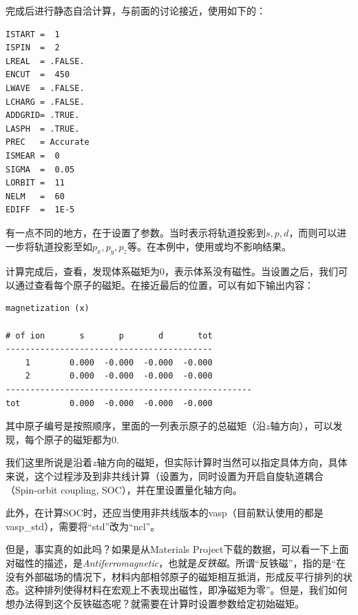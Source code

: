 完成后进行静态自洽计算，与前面的讨论接近，使用如下的：

\begin{lstlisting}[caption=INCAR]
ISTART =  1
ISPIN  =  2
LREAL  = .FALSE.
ENCUT  =  450
LWAVE  = .FALSE.
LCHARG = .FALSE.
ADDGRID= .TRUE.
LASPH  = .TRUE.
PREC   = Accurate
ISMEAR =  0
SIGMA  =  0.05
LORBIT =  11
NELM   =  60
EDIFF  =  1E-5
\end{lstlisting}

有一点不同的地方，在于设置了参数。当时表示将轨道投影到$s,p,d$，而则可以进一步将轨道投影至如$p_x,p_y,p_z$等。在本例中，使用或均不影响结果。

计算完成后，查看，发现体系磁矩为0，表示体系没有磁性。当设置之后，我们可以通过查看每个原子的磁矩。在接近最后的位置，可以有如下输出内容：

\begin{lstlisting}[caption=OUTCAR]
magnetization (x)

# of ion       s       p       d       tot
------------------------------------------
    1        0.000  -0.000  -0.000  -0.000
    2        0.000  -0.000  -0.000  -0.000
--------------------------------------------------
tot          0.000  -0.000  -0.000  -0.000
\end{lstlisting}

其中原子编号是按照顺序，里面的一列表示原子的总磁矩（沿$z$轴方向），可以发现，每个原子的磁矩都为0.

\begin{extend}
    我们这里所说是沿着$z$轴方向的磁矩，但实际计算时当然可以指定具体方向，具体来说，这个过程涉及到非共线计算（设置为，同时设置为开启自旋轨道耦合（Spin-orbit coupling, SOC），并在里设置量化轴方向。

    此外，在计算SOC时，还应当使用非共线版本的vasp（目前默认使用的都是vasp\_std），需要将“std”改为“ncl”。
\end{extend}

但是，事实真的如此吗？如果是从Materials Project下载的数据，可以看一下上面对磁性的描述，是\emph{Antiferromagnetic}，也就是\emph{反铁磁}。所谓“反铁磁”，指的是“在没有外部磁场的情况下，材料内部相邻原子的磁矩相互抵消，形成反平行排列的状态。这种排列使得材料在宏观上不表现出磁性，即净磁矩为零”。但是，我们如何想办法得到这个反铁磁态呢？就需要在计算时设置参数给定初始磁矩。

